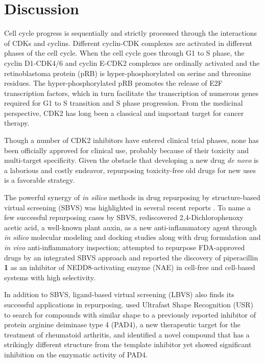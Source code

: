 \section{Discussion}

Cell cycle progress is sequentially and strictly processed through the interactions of CDKs and cyclins. Different cyclin-CDK complexes are activated in different phases of the cell cycle. When the cell cycle goes through G1 to S phase, the cyclin D1-CDK4/6 and cyclin E-CDK2 complexes are ordinally activated and the retinoblastoma protein (pRB) is hyper-phosphorylated on serine and threonine residues. The hyper-phosphorylated pRB promotes the release of E2F transcription factors, which in turn facilitate the transcription of numerous genes required for G1 to S transition and S phase progression. From the medicinal perspective, CDK2 has long been a classical and important target for cancer therapy.

Though a number of CDK2 inhibitors have entered clinical trial phases, none has been officially approved for clinical use, probably because of their toxicity and multi-target specificity. Given the obstacle that developing a new drug \textit{de novo} is a laborious and costly endeavor, repurposing toxicity-free old drugs for new uses is a favorable strategy.

The powerful synergy of \textit{in silico} methods in drug repurposing by structure-based virtual screening (SBVS) was highlighted in several recent reports \citep{1384}. To name a few successful repurposing cases by SBVS, \citep{1507} rediscovered 2,4-Dichlorophenoxy acetic acid, a well-known plant auxin, as a new anti-inflammatory agent through \textit{in silico} molecular modeling and docking studies along with drug formulation and \textit{in vivo} anti-inflammatory inspection; \citep{1506} attempted to repurpose FDA-approved drugs by an integrated SBVS approach and reported the discovery of piperacillin \textbf{1} as an inhibitor of NEDD8-activating enzyme (NAE) in cell-free and cell-based systems with high selectivity.

In addition to SBVS, ligand-based virtual screening (LBVS) also finds its successful applications in repurposing. \citep{1504} used Ultrafast Shape Recognition (USR) \citep{1379} to search for compounds with similar shape to a previously reported inhibitor of protein arginine deiminase type 4 (PAD4), a new therapeutic target for the treatment of rheumatoid arthritis, and identified a novel compound that has a strikingly different structure from the template inhibitor yet showed significant inhibition on the enzymatic activity of PAD4.

